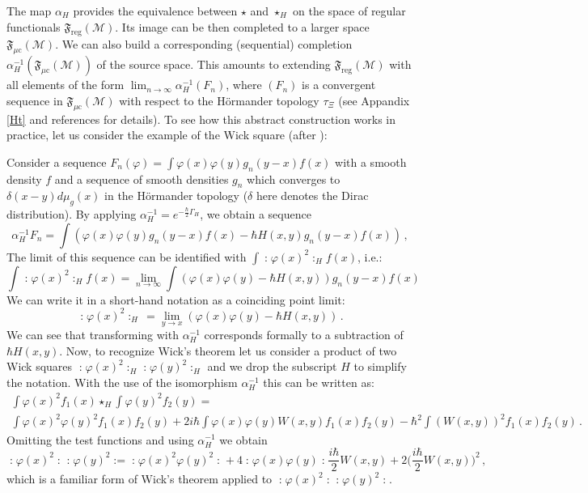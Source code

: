 \documentclass[12pt]{article}
\newcommand{\F}{\mathfrak{F}}
\newcommand{\Mcal}{\mathcal{M}}
\newcommand{\reg}{\mathrm{reg}}
\newcommand{\mc}{{\mu\mathrm{c}}}
\newcommand{\al}{\alpha}
\newcommand{\ph}{\varphi}
\newcommand{\1}{\mathds{1}}                         %
\begin{document}
{{The map $\al_H$ provides the equivalence between $\star$ and $\star_H$ on the space of regular functionals $\F_\reg(\Mcal)$. Its image can be then completed to a larger space $\F_\mc(\Mcal)$. We can also build a corresponding (sequential) completion $\al_H^{-1}(\F_\mc(\Mcal))$ of the source space. This amounts to extending  $\F_\reg(\Mcal)$ with all elements of the form $\lim_{n\rightarrow \infty}\al_H^{-1}(F_n)$, where $(F_n)$ is a convergent sequence in $\F_\mc(\Mcal)$ with respect to the H\"ormander topology $\tau_\Xi$ (see Appandix \ref{Ht} and references \cite{BDF,BaerF,Hoer1} for details). To see how this abstract construction works in practice, let us consider the example of the Wick square (after \cite{FR12}):
 \begin{exa}\label{Wick}
Consider a sequence $F_n(\ph)=\int \ph(x)\ph(y)g_n(y-x)f(x)$ with a smooth density $f$ and a sequence of smooth densities $g_n$ which converges to $\delta(x-y) d\mu_g(x)$ in the H\"ormander topology ($\delta$ here denotes the Dirac distribution). By applying $\al_H^{-1}=e^{-\tfrac{\hbar}{2}\Gamma_H}$, we obtain a sequence 
\[
\al_H^{-1}F_n= \int (\ph(x)\ph(y)g_n(y-x)f(x)-\hbar H(x,y)g_n(y-x)f(x))\,,
\]
The limit of this sequence can be identified with $\int \mathopen:\ph(x)^2\mathclose:_Hf(x)$, i.e.:
\[
\int \mathopen:\ph(x)^2\mathclose:_Hf(x)=\lim_{n\rightarrow\infty}\int (\ph(x)\ph(y)-\hbar H(x,y))g_n(y-x)f(x)
\]
We can write it in a short-hand notation as a coinciding point limit:
\[
\mathopen:\ph(x)^2\mathclose:_H\,=\lim_{y\rightarrow x}(\ph(x)\ph(y)-\hbar H(x,y))\,.
\]
 We can see that transforming with $\al_H^{-1}$ corresponds formally to a subtraction of $\hbar H(x,y)$.
Now, to recognize Wick's theorem let us consider a product of two Wick squares $ \mathopen:\ph(x)^2\mathclose:_H \mathopen:\ph(y)^2\mathclose:_H$  and we drop the subscript $H$ to simplify the notation. With the use of the isomorphism $\al_H^{-1}$ this can be written as:
\begin{multline*}
\int \ph(x)^2 f_1(x)\star_H\int \ph(y)^2 f_2(y)=\\
\int \ph(x)^2 \ph(y)^2f_1(x) f_2(y)+2i\hbar \int \ph(x) \ph(y)W(x,y)f_1(x) f_2(y)-\hbar^2\int (W(x,y))^2f_1(x) f_2(y)\,.
\end{multline*}
Omitting the test functions and using $\al_H^{-1}$ we obtain
\[
\mathopen:\ph(x)^2\mathclose:\mathopen:\ph(y)^2\mathclose:=\mathopen:\ph(x)^2 \ph(y)^2\mathclose:+4 \mathopen:\ph(x) \ph(y)\mathclose:\frac{i\hbar}{2}W(x,y)+2\Big(\frac{i\hbar}{2}W(x,y)\Big)^2\,,
\]
which is a familiar form of Wick's theorem applied to $\mathopen:\ph(x)^2\mathclose:\mathopen:\ph(y)^2\mathclose:$.

\end{exa}}}
\end{document}
